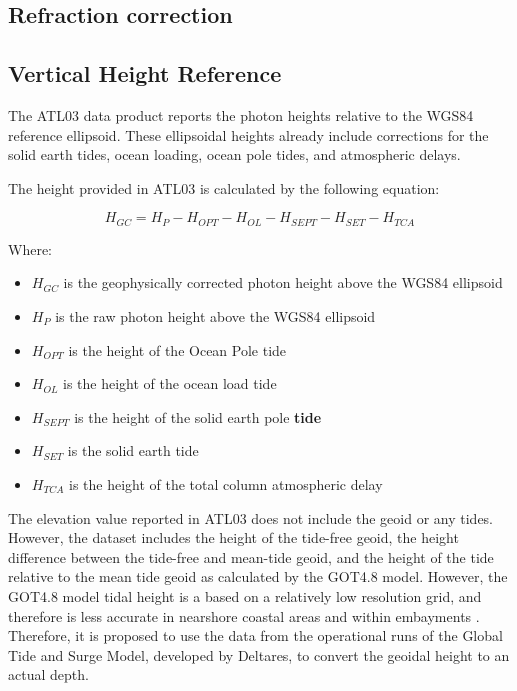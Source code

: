 \subsection{Refraction correction}


\subsection{Vertical Height Reference}
The ATL03 data product reports the photon heights relative to the WGS84 reference ellipsoid. These ellipsoidal heights already include corrections for the solid earth tides, ocean loading, ocean pole tides, and atmospheric delays. 

The height provided in ATL03 is calculated by the following equation:

\[H_{GC} =  H_{P} - H_{OPT} - H_{OL} - H_{SEPT} - H_{SET} - H_{TCA}\]

Where:

\begin{itemize}

      \item \(H_{GC}\) is the geophysically corrected photon height above the WGS84 ellipsoid
      \item \(H_{P}\) is the raw photon height above the WGS84 ellipsoid
      \item \(H_{OPT}\) is the height of the Ocean Pole tide
      \item \(H_{OL}\) is the height of the ocean load tide
      \item \(H_{SEPT}\) is the height of the solid earth pole \textbf{tide}
      \item \(H_{SET}\) is the solid earth tide
      \item \(H_{TCA}\) is the height of the total column atmospheric delay
\end{itemize}

The elevation value reported in ATL03 does not include the geoid or any tides. However, the dataset includes the height of the tide-free geoid, the height difference between the tide-free and mean-tide geoid, and the height of the tide relative to the mean tide geoid as calculated by the GOT4.8 model. However, the GOT4.8 model tidal height is a based on a relatively low resolution grid, and therefore is less accurate in nearshore coastal areas and within embayments \parencite{Neumann2019e}. Therefore, it is proposed to use the data from the operational runs of the Global Tide and Surge Model, developed by Deltares, to convert the geoidal height to an actual depth.

